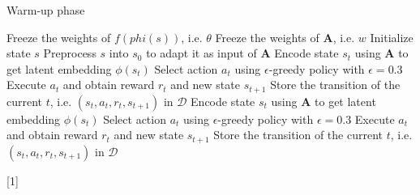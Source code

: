 \documentclass[a4paper,12pt,oneside]{article}
\numberwithin{equation}{section}
\begin{document}
    \clearpage
    \begin{algorithm}
    \caption{Warm-up phase}
        \begin{algorithmic}[1]
        \State Freeze the weights of \(f(phi(s))\), i.e. $\theta$
        \State Freeze the weights of $\mathbf{A}$, i.e. \(w\)
            \State Initialize state \(s\) 
            \State Preprocess \(s\) into \(s_0\) to adapt it as input of $\mathbf{A}$
                \State Encode state \(s_t\) using $\mathbf{A}$ to get latent embedding $\phi(s_t)$
                \State Select action $a_t$ using $\epsilon$-greedy policy with $\epsilon=0.3$
                \State Execute $a_t$ and obtain reward $r_t$ and new state $s_{t+1}$
                \State Store the transition of the current \(t\), i.e. $(s_t, a_t, r_t, s_{t+1})$ in $\mathcal{D}$
                \State Encode state \(s_t\) using $\mathbf{A}$ to get latent embedding $\phi(s_t)$
                \State Select action $a_t$ using $\epsilon$-greedy policy with $\epsilon=0.3$
                \State Execute $a_t$ and obtain reward $r_t$ and new state $s_{t+1}$
                \State Store the transition of the current \(t\), i.e. $(s_t, a_t, r_t, s_{t+1})$ in $\mathcal{D}$
            \EndFor
        \EndFor
        \end{algorithmic}[1]
    \end{algorithm}
    
\end{document}
